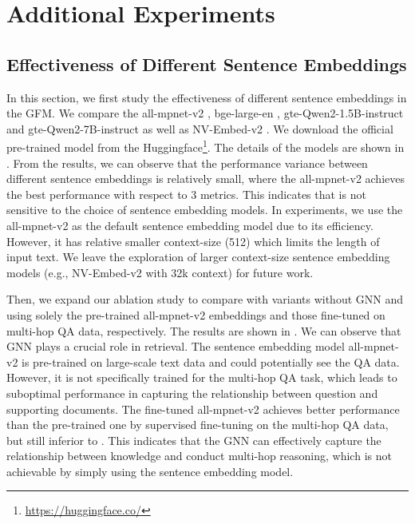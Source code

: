 \section{Additional Experiments}\label{app:additional_experiments}


\subsection{Effectiveness of Different Sentence Embeddings}\label{app:text_embeddings}

In this section, we first study the effectiveness of different sentence embeddings in the GFM. We compare the all-mpnet-v2 \citep{all-mpnet-v2}, bge-large-en \citep{bge_embedding}, gte-Qwen2-1.5B-instruct and gte-Qwen2-7B-instruct \citep{li2023towards} as well as NV-Embed-v2 \citep{lee2024nv}. We download the official pre-trained model from the Huggingface\footnote{\url{https://huggingface.co/}}. The details of the models are shown in . From the results, we can  observe that the performance variance between different sentence embeddings is relatively small, where the all-mpnet-v2 achieves the best performance with respect to 3 metrics. This indicates that \ourmethod is not sensitive to the choice of sentence embedding models. In experiments, we use the all-mpnet-v2 as the default sentence embedding model due to its efficiency. However, it has relative smaller context-size (512) which limits the length of input text. We leave the exploration of larger context-size sentence embedding models (e.g., NV-Embed-v2 with 32k context) for future work.

Then, we expand our ablation study to compare \ourmethod with variants without GNN and using solely the pre-trained all-mpnet-v2 embeddings and those fine-tuned on multi-hop QA data, respectively. The results are shown in . We can observe that GNN plays a crucial role in retrieval. The sentence embedding model all-mpnet-v2 is pre-trained on large-scale text data and could potentially see the QA data. However, it is not specifically trained for the multi-hop QA task, which leads to suboptimal performance in capturing the relationship between question and supporting documents. The fine-tuned all-mpnet-v2 achieves better performance than the pre-trained one by supervised fine-tuning on the multi-hop QA data, but still inferior to \ourmethod. This indicates that the GNN can effectively capture the relationship between knowledge and conduct multi-hop reasoning, which is not achievable by simply using the sentence embedding model.

